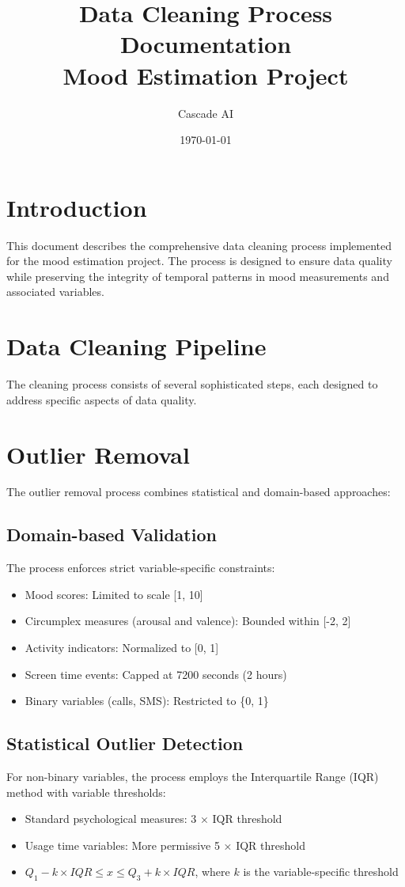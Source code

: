 \documentclass{article}
\title{Data Cleaning Process Documentation\\Mood Estimation Project}
\author{Cascade AI}
\date{\today}
\begin{document}
\maketitle

\section{Introduction}
This document describes the comprehensive data cleaning process implemented for the mood estimation project. The process is designed to ensure data quality while preserving the integrity of temporal patterns in mood measurements and associated variables.

\section{Data Cleaning Pipeline}
The cleaning process consists of several sophisticated steps, each designed to address specific aspects of data quality.

\section{Outlier Removal}
The outlier removal process combines statistical and domain-based approaches:

\subsection{Domain-based Validation}
The process enforces strict variable-specific constraints:
\begin{itemize}[noitemsep]
\item Mood scores: Limited to scale [1, 10]
\item Circumplex measures (arousal and valence): Bounded within [-2, 2]
\item Activity indicators: Normalized to [0, 1]
\item Screen time events: Capped at 7200 seconds (2 hours)
\item Binary variables (calls, SMS): Restricted to \{0, 1\}
\end{itemize}

\subsection{Statistical Outlier Detection}
For non-binary variables, the process employs the Interquartile Range (IQR) method with variable thresholds:
\begin{itemize}[noitemsep]
\item Standard psychological measures: 3 × IQR threshold
\item Usage time variables: More permissive 5 × IQR threshold
\item $Q_1 - k\times IQR \leq x \leq Q_3 + k\times IQR$, where $k$ is the variable-specific threshold
\end{itemize}
\end{document}
